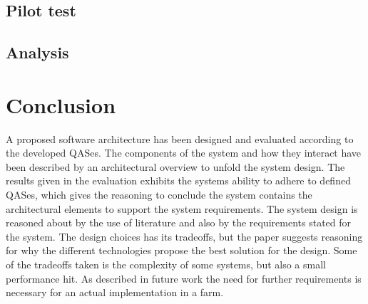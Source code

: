 \documentclass[conference]{IEEEtran}
\begin{document}
\subsection{Pilot test}
\label{sec:pilot_test}

\subsection{Analysis}
\label{sec:analysis}



\section{Conclusion}
A proposed software architecture has been designed and evaluated according to the developed QASes. The components of the system and how they interact have been described by an architectural overview to unfold the system design. The results given in the evaluation exhibits the systems ability to adhere to defined QASes, which gives the reasoning to conclude the system contains the architectural elements to support the system requirements.
The system design is reasoned about by the use of literature and also by the requirements stated for the system. The design choices has its tradeoffs, but the paper suggests reasoning for why the different technologies propose the best solution for the design. Some of the tradeoffs taken is the complexity of some systems, but also a small performance hit. As described in future work the need for further requirements is necessary for an actual implementation in a farm.



\vspace{12pt}
\end{document}
